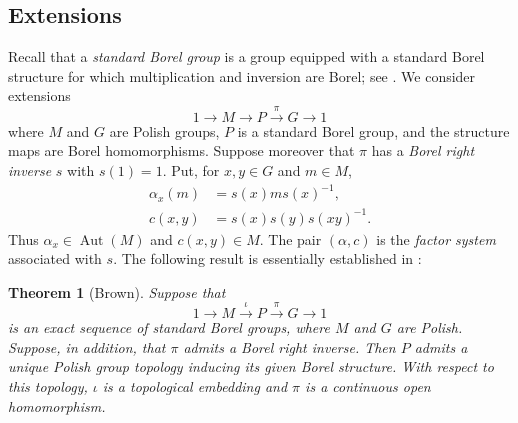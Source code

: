 \documentclass[12pt]{amsart}
\newtheorem{theorem}{Theorem}[section]
\theoremstyle{definition}
\newcommand{\func}[1]{\operatorname{#1}}
\begin{document}
\subsection{Extensions}

Recall that a \emph{standard Borel group} is a group equipped with a
standard Borel structure for which multiplication and inversion are Borel;
see \cite{mackey_borel_1957}. We consider extensions 
\begin{equation}
1\longrightarrow M\longrightarrow P\overset{\pi }{\longrightarrow }%
G\longrightarrow 1
\end{equation}%
where $M$ and $G$ are Polish groups, $P$ is a standard Borel group, and the
structure maps are Borel homomorphisms. Suppose moreover that $\pi $ has a 
\emph{Borel right inverse} $s$ with $s(1)=1$. Put, for $x,y\in G$ and $m\in
M $, 
\begin{align}
\alpha _{x}(m)& =s(x)ms(x)^{-1}, \\
c(x,y)& =s(x)s(y)s(xy)^{-1}.
\end{align}%
Thus $\alpha _{x}\in \func{Aut}(M)$ and $c(x,y)\in M$. The pair $(\alpha ,c)$
is the \emph{factor system} associated with $s$. The following result is
essentially established in \cite[Theorem, p.~73]{brown_extensions_1971}:

\begin{theorem}[Brown]
\label{thm:brown-extension} Suppose that 
\begin{equation*}
1\longrightarrow M\xrightarrow{\iota}P\xrightarrow{\pi}G\longrightarrow 1
\end{equation*}%
is an exact sequence of standard Borel groups, where $M$ and $G$ are Polish.
Suppose, in addition, that $\pi $ admits a Borel right inverse. Then $P$
admits a unique Polish group topology inducing its given Borel structure.
With respect to this topology, $\iota $ is a topological embedding and $\pi $
is a continuous open homomorphism.
\end{theorem}
\end{document}
